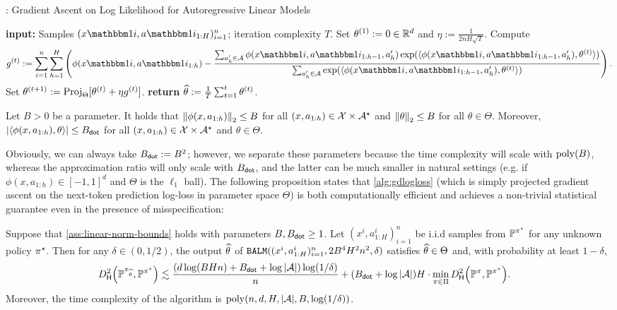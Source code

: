 \begin{algorithm}[t]
\caption{\GDALM: Gradient Ascent on Log Likelihood for Autoregressive Linear Models}\label{alg:gdlogloss}
\begin{algorithmic}[1]
\State\textbf{input:} Samples $(x\ind{i},a\ind{i}_{1:H})_{i=1}^n$; iteration complexity $T$.
\State Set $\theta^{(1)} := 0 \in \mathbb{R}^d$ and $\eta := \frac{1}{2nH\sqrt{T}}$.
    \State Compute
\[g^{(t)} := \sum_{i=1}^n \sum_{h=1}^H \left(\phi(x\ind{i},a\ind{i}_{1:h}) - \frac{\sum_{a_h'\in\MA} \phi(x\ind{i},a\ind{i}_{1:h-1},a'_h) \exp(\langle \phi(x\ind{i},a\ind{i}_{1:h-1},a'_h),\theta^{(t)}\rangle)}{\sum_{a_h'\in\MA} \exp(\langle \phi(x\ind{i},a\ind{i}_{1:h-1},a'_h),\theta^{(t)}\rangle)}\right).\]
\State Set $\theta^{(t+1)} := \operatorname{Proj}_\Theta[\theta^{(t)} + \eta g^{(t)}]$. \hfill{}
\EndFor
\State \textbf{return} $\widehat{\theta} := \frac{1}{T}\sum_{t=1}^t \theta^{(t)}$.
\end{algorithmic}
\end{algorithm}

\begin{assumption}\label{ass:linear-norm-bounds}
Let $B>0$ be a parameter. It holds that $\left \lVert \phi(x,a_{1:h}) \right \rVert_2 \leq B$ for all $(x,a_{1:h}) \in \mathcal{X}\times\mathcal{A}^\star$ and $\left \lVert \theta \right \rVert_2 \leq B$ for all $\theta\in\Theta$. Moreover, $|\langle \phi(x,a_{1:h}),\theta\rangle| \leq B_{\mathsf{dot}}$ for all $(x,a_{1:h})\in\mathcal{X}\times\mathcal{A}^\star$ and $\theta \in \Theta$. 
\end{assumption}

Obviously, we can always take $B_{\mathsf{dot}} := B^2$; however, we separate these parameters because the time complexity will scale with $\mathrm{poly}(B)$, whereas the approximation ratio will only scale with $B_{\mathsf{dot}}$, and the latter can be much smaller in natural settings (e.g. if $\phi(x,a_{1:h}) \in [-1,1]^d$ and $\Theta$ is the $\ell_1$ ball). The following proposition states that \cref{alg:gdlogloss} (which is simply projected gradient ascent on the next-token prediction log-loss in parameter space $\Theta$) is both computationally efficient and achieves a non-trivial statistical guarantee even in the presence of misspecification:

\begin{proposition}\label{cor:linear-misspec-logloss-app}
Suppose that \cref{ass:linear-norm-bounds} holds with parameters $B,B_{\mathsf{dot}}\geq 1$. Let $(x^i,a^i_{1:H})_{i=1}^n$ be i.i.d samples from $\mathbb{P}^{\pi^{\star}}$ for any unknown policy $\pi^{\star}$. Then for any $\delta \in (0,1/2)$, the output $\widehat{\theta}$ of $\texttt{BALM}((x^i,a^i_{1:H})_{i=1}^n, 2B^4 H^2 n^2,\delta)$ satisfies $\widehat{\theta} \in \Theta$ and, with probability at least $1-\delta$,
\begin{align}
  \Dhels{\BP^{\pi_{\thetahat}}}{\BP^{\pistar}} &\lesssim \frac{(d\log(BHn) + \Bdot + \log|\MA|)\log(1/\delta)}{n} + (\Bdot+\log|\MA|)H \cdot \min_{\pi\in\Pi} \Dhels{\BP^\pi}{\BP^{\pistar}}.\end{align}
Moreover, the time complexity of the algorithm is $\mathrm{poly}(n,d,H,|\mathcal{A}|,B,\log(1/\delta))$.
\end{proposition}

